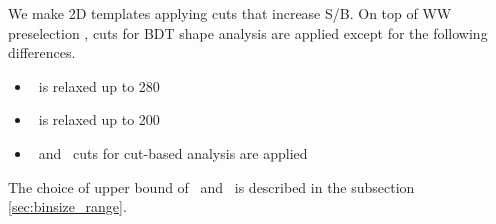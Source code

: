 We make 2D templates applying cuts that increase S/B. 
On top of WW preselection \cite{HWW2012ICHEP}, cuts for BDT shape analysis are applied 
except for the following differences. 

\begin{itemize}
	\item \mt~is relaxed up to 280 \GeV
	\item \mll~is relaxed up to 200 \GeV  
	\item \ptlmax~and \ptlmin~cuts for cut-based analysis are applied    
\end{itemize}

The choice of upper bound of \mt~and \mll~is described in the subsection \ref{sec:binsize_range}. 
